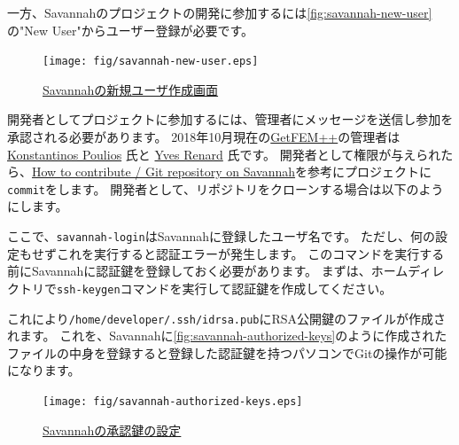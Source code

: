 \documentclass{../../style/ltjoc}
\begin{document}
一方、Savannahのプロジェクトの開発に参加するには\autoref{fig:savannah-new-user}の"New User"からユーザー登録が必要です。
\begin{figure}[htbp]
\centering
\texttt{[image: fig/savannah-new-user.eps]}
\caption{\href{https://savannah.gnu.org/account/register.php}{Savannahの新規ユーザ作成画面}}
\label{fig:savannah-new-user}
\end{figure}
開発者としてプロジェクトに参加するには、管理者にメッセージを送信し参加を承認される必要があります。
2018年10月現在の\href{http://getfem.org}{GetFEM++}の管理者は \href{http://www.dtu.dk/english/service/phonebook/person?id=65472&tab=2&qt=dtupublicationquery}{Konstantinos Poulios} 氏と \href{http://math.univ-lyon1.fr/~renard/}{Yves Renard} 氏です。
開発者として権限が与えられたら、\href{http://getfem.org/project/index.html}{How to contribute / Git repository on Savannah}を参考にプロジェクトに\texttt{commit}をします。
開発者として、リポジトリをクローンする場合は以下のようにします。
\begin{shbox}
\end{shbox}
ここで、\texttt{savannah-login}はSavannahに登録したユーザ名です。
ただし、何の設定もせずこれを実行すると認証エラーが発生します。
このコマンドを実行する前にSavannahに認証鍵を登録しておく必要があります。
まずは、ホームディレクトリで\texttt{ssh-keygen}コマンドを実行して認証鍵を作成してください。
\begin{shbox}
  \shline{}{}
\end{shbox}
これにより\texttt{/home/developer/.ssh/id\textunderscore{}rsa.pub}にRSA公開鍵のファイルが作成されます。
これを、Savannahに\autoref{fig:savannah-authorized-keys}のように作成されたファイルの中身を登録すると登録した認証鍵を持つパソコンでGitの操作が可能になります。
\begin{figure}[htbp]
\centering
\texttt{[image: fig/savannah-authorized-keys.eps]}
\caption{\href{https://savannah.gnu.org/my/admin/editsshkeys.php}{Savannahの承認鍵の設定}}
\label{fig:savannah-authorized-keys}
\end{figure}
\end{document}
